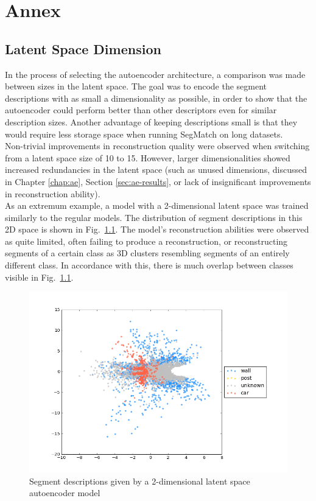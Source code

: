 \chapter{Annex}\label{sec:irgendwas}

\section{Latent Space Dimension}
\label{sec:latent_space_size}

In the process of selecting the autoencoder architecture, a comparison was made between sizes in the latent space. The goal was to encode the segment descriptions with as small a dimensionality as possible, in order to show that the autoencoder could perform better than other descriptors even for similar description sizes. Another advantage of keeping descriptions small is that they would require less storage space when running SegMatch on long datasets.\\

Non-trivial improvements in reconstruction quality were observed when switching from a latent space size of 10 to 15. However, larger dimensionalities showed increased redundancies in the latent space (such as unused dimensions, discussed in Chapter \ref{chap:ae}, Section \ref{sec:ae-results}, or lack of insignificant improvements in reconstruction ability).\\

As an extremum example, a model with a 2-dimensional latent space was trained similarly to the regular models. The distribution of segment descriptions in this 2D space is shown in Fig.~\ref{fig:2d_latent_space}. The model's reconstruction abilities were observed as quite limited, often failing to produce a reconstruction, or reconstructing segments of a certain class as 3D clusters resembling segments of an entirely different class. In accordance with this, there is much overlap between classes visible in Fig.~\ref{fig:2d_latent_space}.\\

\begin{figure}
  \centering
  \includegraphics[width=5.2in]{images/2dlatentspace.png}
  \caption{Segment descriptions given by a 2-dimensional latent space autoencoder model}
  \label{fig:2d_latent_space}
\end{figure}
